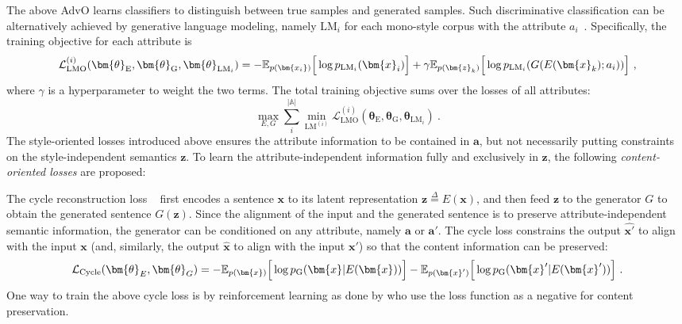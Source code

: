 The above AdvO learns classifiers to distinguish between true samples and generated samples. Such discriminative classification can be alternatively achieved by generative language modeling, namely $\mathrm{LM}_i$ for each mono-style corpus with the attribute $a_i$~. Specifically, the training objective for each attribute is 
\begin{equation}
\begin{split}
    \mathcal{L}_{\mathrm{LMO}}^{(i)}(\bm{\theta}_{\mathrm{E}},\bm{\theta}_{\mathrm{G}},\bm{\theta}_{\mathrm{LM}_i})
    =-\mathbb{E}_{p(\bm{x_i})}\Big{[}\log p_{\mathrm{LM}_i}(\bm{x}_i)\Big{]} 
    +\gamma \mathbb{E}_{p(\bm{z}_k)}\Big{[}\log p_{\mathrm{LM}_i}(G(E(\bm{x}_k); a_i))\Big{]}~,
\end{split}
\end{equation}
where $\gamma$ is a hyperparameter to weight the two terms.
The total training objective sums over the losses of all attributes:
\begin{equation}
    \max_{E,G} \sum_i^{|\mathbb{A}|} \min_{\mathrm{LM}^{(i)}} \mathcal{L}_{\mathrm{LMO}}^{(i)}(\bm{\theta}_{\mathrm{E}},\bm{\theta}_{\mathrm{G}},\bm{\theta}_{\mathrm{LM}_i})~.
\end{equation}
\label{sec:aim2}
The style-oriented losses introduced above ensures the attribute information to be contained in $\bm{a}$, but not necessarily putting constraints on the style-independent semantics $\bm{z}$.
To learn the attribute-independent information fully and exclusively in $\bm{z}$, the following \textit{content-oriented losses} are proposed:

The cycle reconstruction loss
~ first encodes a sentence $\bm{x}$ to its latent representation $\bm{z} \overset{\Delta}{=} E(\bm{x})$, and then feed $\bm{z}$ to the generator $G$ to obtain the generated sentence $G(\bm{z})$. Since the alignment of the input and the generated sentence is to preserve attribute-independent semantic information, the generator can be conditioned on any attribute, namely $\bm{a}$ or $\bm{a}'$. The cycle loss constrains the output $\widehat{\bm{x}'}$ to align with the input $\bm{x}$ (and, similarly, the output $\widehat{\bm{x}}$ to align with the input $\bm{x}'$) so that the content information can be preserved:
\begin{equation}
   \mathcal{L}_{\mathrm{Cycle}}(\bm{\theta}_{E},\bm{\theta}_{G})=- \mathbb{E}_{p(\bm{x})}\Big{[}\log p_{\mathrm{G}}(\bm{x}|E(\bm{x}))\Big{]}
   -\mathbb{E}_{p(\bm{x}')}\Big{[}\log p_{\mathrm{G}}(\bm{x}'|E(\bm{x}'))\Big{]}
   ~. \label{eq:cycle_loss}
\end{equation}
One way to train the above cycle loss is by reinforcement learning as done by  who use the loss function as a negative for content preservation.

